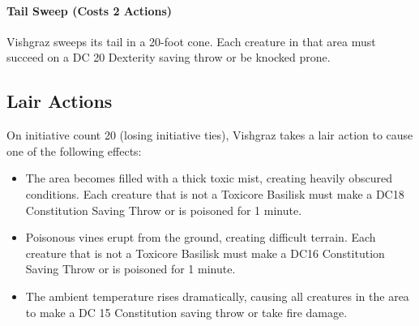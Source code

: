 \documentclass[letterpaper,openany,twoside,twocolumn]{book}
\begin{document}
\paragraph{Tail Sweep (Costs 2 Actions)} Vishgraz sweeps its tail in a 20-foot cone. Each creature in that area must succeed on a DC 20 Dexterity saving throw or be knocked prone.

\subsection*{Lair Actions}
On initiative count 20 (losing initiative ties), Vishgraz takes a lair action to cause one of the following effects:
\begin{itemize}
	\item The area becomes filled with a thick toxic mist, creating heavily obscured conditions. Each creature that is not a Toxicore Basilisk must make a DC18 Constitution Saving Throw or is poisoned for 1 minute.
	\item Poisonous vines erupt from the ground, creating difficult terrain. Each creature that is not a Toxicore Basilisk must make a DC16 Constitution Saving Throw or is poisoned for 1 minute.
	\item  The ambient temperature rises dramatically, causing all creatures in the area to make a DC 15 Constitution saving throw or take  fire damage.
\end{itemize}

%
\end{document}
